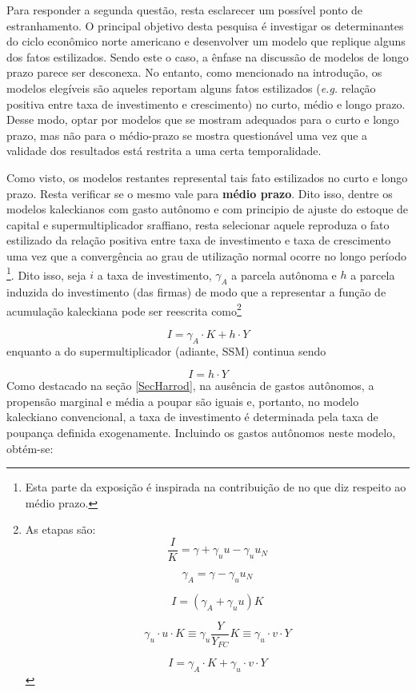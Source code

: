 Para responder a segunda questão, resta esclarecer um possível ponto de estranhamento. O principal objetivo desta pesquisa é investigar os determinantes do ciclo econômico norte americano e desenvolver um modelo que replique alguns dos fatos estilizados. Sendo este o caso, a ênfase na discussão de modelos de longo prazo parece ser desconexa. 
No entanto, como mencionado na introdução, os modelos elegíveis são aqueles reportam alguns fatos estilizados (\textit{e.g.} relação positiva entre taxa de investimento e crescimento)  no curto, médio e longo prazo.
Desse modo, optar por modelos que se mostram adequados para o curto e longo prazo, mas não para o médio-prazo se mostra questionável uma vez que a validade dos resultados está restrita a uma certa temporalidade. 

Como visto, os modelos restantes represental tais fato estilizados no curto e longo prazo. Resta verificar se o mesmo vale para \textbf{médio prazo}. Dito isso, dentre os modelos kaleckianos com gasto autônomo e com principio de ajuste do estoque de capital e supermultiplicador sraffiano, resta selecionar aquele reproduza o fato estilizado da relação positiva entre taxa de investimento e taxa de crescimento uma vez que a convergência ao grau de utilização normal ocorre no longo período \cites[p.~172]{cesaratto_neo-kaleckian_2015}[p.~8--9]{fiebiger_trend_2017}\footnote{Esta parte da exposição é inspirada na contribuição de \textcite{fagundes_role_2017} no que diz respeito ao médio prazo.}. Dito isso, seja $i$ a taxa de investimento, $\gamma_A$ a parcela autônoma e $h$ a parcela induzida do investimento (das firmas) de modo que a representar a função de acumulação kaleckiana pode ser reescrita como\footnote{
	As etapas são:
	$$
	\frac{I}{K}  = \gamma + \gamma_uu - \gamma_uu_N
	$$
	
	$$
	\gamma_A = \gamma - \gamma_uu_N
	$$
	
	$$
	I = (\gamma_A + \gamma_uu)K
	$$
	
	$$
	\gamma_u\cdot u \cdot K \equiv \gamma_u\frac{Y}{Y_{FC}}K \equiv \gamma_u\cdot v\cdot Y
	$$
	
	$$
	I = \gamma_A\cdot K + \gamma_u\cdot v\cdot Y
	$$
}

\begin{equation}
\tag{kaleckiana}
I = \gamma_A\cdot K + h\cdot Y
\end{equation}
enquanto a do supermultiplicador (adiante, SSM) continua sendo

\begin{equation}
\tag{SSM}
I = h\cdot Y
\end{equation}
Como destacado na seção \ref{SecHarrod}, na ausência de gastos autônomos, a propensão marginal e média a poupar são iguais e, portanto, no modelo kaleckiano convencional, a taxa de investimento é determinada pela taxa de poupança definida exogenamente. Incluindo os gastos autônomos neste modelo, obtém-se:

